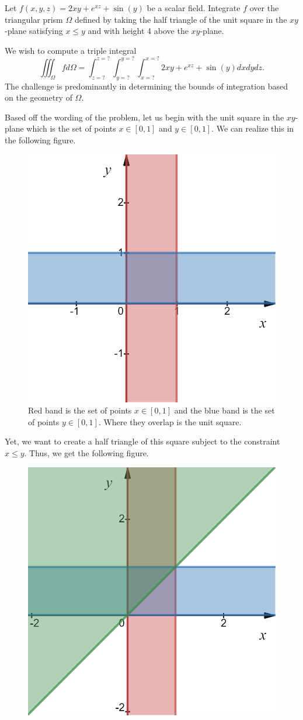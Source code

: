 \documentclass[12pt]{article} %
\begin{document}
\newpage
\begin{problem}
Let $f(x,y,z)=2xy+e^{xz}+\sin(y)$ be a scalar field. Integrate $f$ over the triangular prism $\Omega$ defined by taking the half triangle of the unit square in the $xy$-plane satisfying $x\leq y$ and with height 4 above the $xy$-plane.
\end{problem}
\begin{solution}
We wish to compute a triple integral
\[
\iiint_{\Omega} f d\Omega = \int_{z=?}^{z=?} \int_{y=?}^{y=?} \int_{x=?}^{x=?} 2xy +e^{xz} + \sin(y) dxdydz.
\]
The challenge is predominantly in determining the bounds of integration based on the geometry of $\Omega$. 

Based off the wording of the problem, let us begin with the unit square in the $xy$-plane which is the set of points $x\in [0,1]$ and $y\in [0,1]$. We can realize this in the following figure.
\begin{figure}[H]
    \centering
    \includegraphics[width=.6\textwidth]{figures/bounds_1.png}
    \caption{Red band is the set of points $x\in [0,1]$ and the blue band is the set of points $y\in [0,1]$. Where they overlap is the unit square.}
\end{figure}
Yet, we want to create a half triangle of this square subject to the constraint $x\leq y$. Thus, we get the following figure.
\begin{figure}[H]
    \centering
    \includegraphics[width=.6\textwidth]{figures/bounds_2.png}

\end{figure}
\end{solution}
\end{document}
